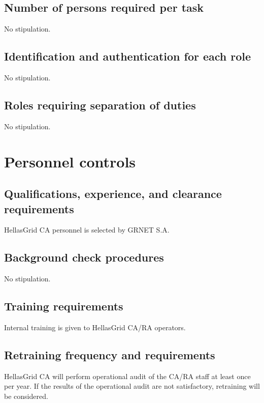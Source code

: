 \subsection{Number of persons required per task}

No stipulation.

\subsection{Identification and authentication for each role}

No stipulation.

\subsection{Roles requiring separation of duties}

No stipulation.

\section{Personnel controls}
\subsection{Qualifications, experience, and clearance requirements}

HellasGrid CA personnel is selected by GRNET S.A.


\subsection{Background check procedures}

No stipulation.

\subsection{Training requirements}

Internal training is given to HellasGrid CA/RA operators.

\subsection{Retraining frequency and requirements}
\label{sub:RetrainingFrequencyAndRequirements}

HellasGrid CA will perform operational audit of the CA/RA staff at least once per year. If the results of the operational audit are not satisfactory, retraining will be considered.

